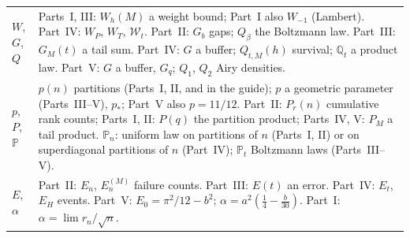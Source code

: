 \documentclass[11pt,letterpaper]{article}
\numberwithin{equation}{section}
\theoremstyle{remark}\newtheorem{remark}[theorem]{Remark}
\begin{document}
\begin{longtable}{@{}>{\raggedright\arraybackslash}p{} >{\raggedright\arraybackslash}p{}@{}}
$W$, $G$, $Q$ & Parts~I, III: $W_h(M)$ a weight bound; Part~I also $W_{-1}$ (Lambert). Part~IV: $W_P$, $W_T$, $\mathcal W_t$. Part~II: $G_b$ gaps; $Q_\beta$ the Boltzmann law. Part~III: $G_M(t)$ a tail sum. Part~IV: $G$ a buffer; $Q_{t,M}(h)$ survival; $\mathbb Q_t$ a product law. Part~V: $G$ a buffer, $G_q$; $Q_1$, $Q_2$ Airy densities.\\
$p$, $P$, $\mathbb P$ & $p(n)$ partitions (Parts~I, II, and in the guide); $p$ a geometric parameter (Parts~III--V), $p_*$; Part~V also $p=11/12$. Part~II: $P_r(n)$ cumulative rank counts; Parts~I, II: $P(q)$ the partition product; Parts~IV, V: $P_M$ a tail product. $\mathbb P_n$: uniform law on partitions of $n$ (Parts~I, II) or on superdiagonal partitions of $n$ (Part~IV); $\mathbb P_t$ Boltzmann laws (Parts~III--V).\\
$E$, $\alpha$ & Part~II: $E_n$, $E_n^{(M)}$ failure counts. Part~III: $E(t)$ an error. Part~IV: $E_t$, $E_H$ events. Part~V: $E_0=\pi^2/12-b^2$; $\alpha=a^2(\frac14-\frac b{30})$. Part~I: $\alpha=\lim r_n/\sqrt n$.\\
\bottomrule
\end{longtable}
\addtocounter{table}{-1}%
\endgroup
\end{document}
